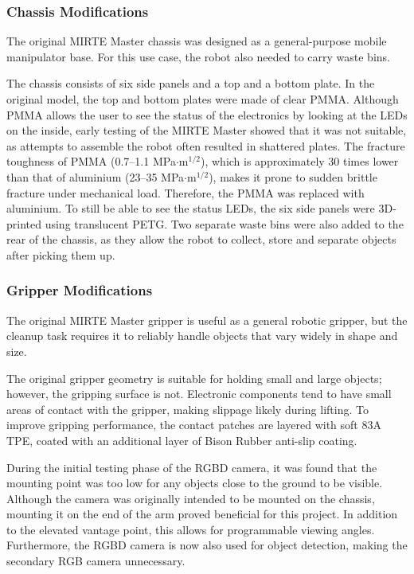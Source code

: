     \subsubsection{Chassis Modifications}

    The original MIRTE Master chassis was designed as a general-purpose mobile manipulator base. For this use case, the robot also needed to carry waste bins.

    The chassis consists of six side panels and a top and a bottom plate. In the original model, the top and bottom plates were made of clear PMMA. Although PMMA allows the user to see the status of the electronics by looking at the LEDs on the inside, early testing of the MIRTE Master showed that it was not suitable, as attempts to assemble the robot often resulted in shattered plates. The fracture toughness of PMMA (0.7--1.1 MPa$\cdot$m$^{1/2}$), which is approximately 30 times lower than that of aluminium (23--35 MPa$\cdot$m$^{1/2}$), makes it prone to sudden brittle fracture under mechanical load. Therefore, the PMMA was replaced with aluminium. To still be able to see the status LEDs, the six side panels were 3D-printed using translucent PETG. Two separate waste bins were also added to the rear of the chassis, as they allow the robot to collect, store and separate objects after picking them up.
    \subsubsection{Gripper Modifications}

    The original MIRTE Master gripper is useful as a general robotic gripper, but the cleanup task requires it to reliably handle objects that vary widely in shape and size.

    The original gripper geometry is suitable for holding small and large objects; however, the gripping surface is not. Electronic components tend to have small areas of contact with the gripper, making slippage likely during lifting. To improve gripping performance, the contact patches are layered with soft 83A TPE, coated with an additional layer of Bison Rubber anti-slip coating.

    During the initial testing phase of the RGBD camera, it was found that the mounting point was too low for any objects close to the ground to be visible. Although the camera was originally intended to be mounted on the chassis, mounting it on the end of the arm proved beneficial for this project. In addition to the elevated vantage point, this allows for programmable viewing angles. Furthermore, the RGBD camera is now also used for object detection, making the secondary RGB camera unnecessary.

